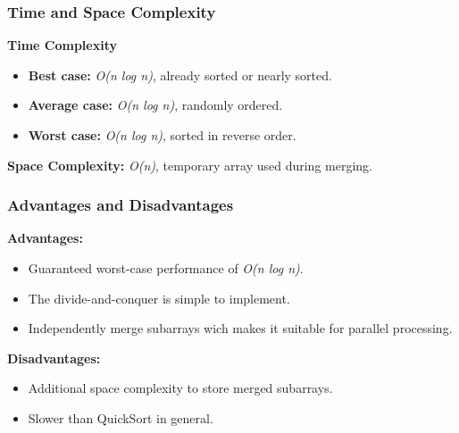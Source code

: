 \subsubsection*{Time and Space Complexity}

\textbf{Time Complexity}

\begin{itemize}
  \item \textbf{Best case:} \textit{O(n log n)}, already sorted or nearly sorted.
  \item \textbf{Average case:} \emph{O(n log n)}, randomly ordered.
  \item \textbf{Worst case:} \textit{O(n log n)}, sorted in reverse order.
\end{itemize}

\textbf{Space Complexity:} \textit{O(n)}, temporary array used during merging.

\subsubsection*{Advantages and Disadvantages}

\textbf{Advantages:}

\begin{itemize}
  \item Guaranteed worst-case performance of \textit{O(n log n)}.
  \item The divide-and-conquer is simple to implement.
  \item Independently merge subarrays wich makes it suitable for parallel processing.
\end{itemize}

\textbf{Disadvantages:}

\begin{itemize}
  \item Additional space complexity to store merged subarrays.
  \item Slower than QuickSort in general.
\end{itemize}
